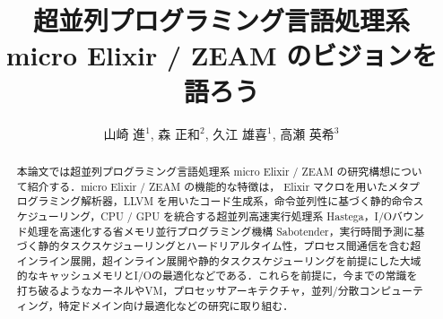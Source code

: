 \documentclass[japanese]{jssst_ppl}
\title{超並列プログラミング言語処理系 micro Elixir / ZEAM のビジョンを語ろう}
\author{山崎 進$^1$, 森 正和$^2$, 久江 雄喜$^1$, 高瀬 英希$^3$}
\begin{document}
\maketitle

\begin{abstract}
本論文では超並列プログラミング言語処理系 micro Elixir / ZEAM の研究構想について紹介する．micro Elixir / ZEAM の機能的な特徴は， Elixir マクロを用いたメタプログラミング解析器，LLVM を用いたコード生成系，命令並列性に基づく静的命令スケジューリング，CPU / GPU を統合する超並列高速実行処理系 Hastega，I/Oバウンド処理を高速化する省メモリ並行プログラミング機構 Sabotender，実行時間予測に基づく静的タスクスケジューリングとハードリアルタイム性，プロセス間通信を含む超インライン展開，超インライン展開や静的タスクスケジューリングを前提にした大域的なキャッシュメモリとI/Oの最適化などである．これらを前提に，今までの常識を打ち破るようなカーネルやVM，プロセッサアーキテクチャ，並列/分散コンピューティング，特定ドメイン向け最適化などの研究に取り組む．
\end{abstract}







\end{document}

